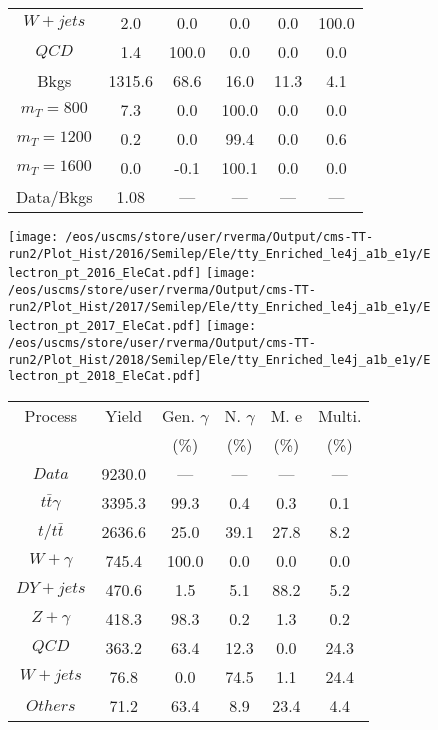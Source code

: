 \begin{figure}
\begin{minipage}[c]{0.32\textwidth}
{\begin{tabular}{cccccc}
$ W+jets $ &  2.0 &  0.0 &  0.0 &  0.0 &  100.0\\
$ QCD $ &  1.4 &  100.0 &  0.0 &  0.0 &  0.0\\
Bkgs &  1315.6 &  68.6 &  16.0 &  11.3 &  4.1\\
$ m_{T} = 800 $ &  7.3 &  0.0 &  100.0 &  0.0 &  0.0\\
$ m_{T} = 1200 $ &  0.2 &  0.0 &  99.4 &  0.0 &  0.6\\
$ m_{T} = 1600 $ &  0.0 &  -0.1 &  100.1 &  0.0 &  0.0\\
Data/Bkgs &  1.08 &  --- &  --- &  --- &  ---\\
\hline
\end{tabular}
}
\end{minipage}
\end{figure}

\begin{figure}
\centering
\texttt{[image: /eos/uscms/store/user/rverma/Output/cms-TT-run2/Plot\_Hist/2016/Semilep/Ele/tty\_Enriched\_le4j\_a1b\_e1y/Electron\_pt\_2016\_EleCat.pdf]}
\texttt{[image: /eos/uscms/store/user/rverma/Output/cms-TT-run2/Plot\_Hist/2017/Semilep/Ele/tty\_Enriched\_le4j\_a1b\_e1y/Electron\_pt\_2017\_EleCat.pdf]}
\texttt{[image: /eos/uscms/store/user/rverma/Output/cms-TT-run2/Plot\_Hist/2018/Semilep/Ele/tty\_Enriched\_le4j\_a1b\_e1y/Electron\_pt\_2018\_EleCat.pdf]}
\begin{minipage}[c]{0.32\textwidth}
\centering
\tiny{
\begin{tabular}{cccccc}
\hline
Process & Yield & Gen. $\gamma$ & N. $\gamma$ & M. e & Multi. \\
 &  & (\%) & (\%) & (\%) & (\%)  \\
\hline
                                                                      $ Data $ &  9230.0 &  --- &  --- &  --- &  ---\\
$ t\bar{t}\gamma $ &  3395.3 &  99.3 &  0.4 &  0.3 &  0.1\\
$ t/t\bar{t} $ &  2636.6 &  25.0 &  39.1 &  27.8 &  8.2\\
$ W+\gamma $ &  745.4 &  100.0 &  0.0 &  0.0 &  0.0\\
$ DY+jets $ &  470.6 &  1.5 &  5.1 &  88.2 &  5.2\\
$ Z+\gamma $ &  418.3 &  98.3 &  0.2 &  1.3 &  0.2\\
$ QCD $ &  363.2 &  63.4 &  12.3 &  0.0 &  24.3\\
$ W+jets $ &  76.8 &  0.0 &  74.5 &  1.1 &  24.4\\
$ Others $ &  71.2 &  63.4 &  8.9 &  23.4 &  4.4\\

\end{tabular}}
\end{minipage}
\end{figure}
